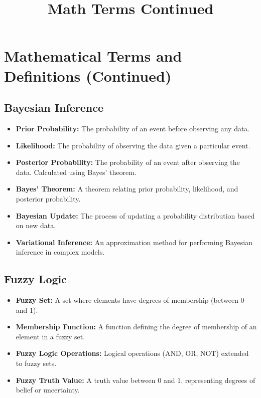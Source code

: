 \documentclass{article}
\title{Math Terms Continued}
\date{}
\begin{document}
\maketitle

\section{Mathematical Terms and Definitions (Continued)}

\subsection{Bayesian Inference}

\begin{itemize}
    \item \textbf{Prior Probability:} The probability of an event before observing any data.
    \item \textbf{Likelihood:} The probability of observing the data given a particular event.
    \item \textbf{Posterior Probability:} The probability of an event after observing the data.  Calculated using Bayes' theorem.
    \item \textbf{Bayes' Theorem:} A theorem relating prior probability, likelihood, and posterior probability.
    \item \textbf{Bayesian Update:} The process of updating a probability distribution based on new data.
    \item \textbf{Variational Inference:} An approximation method for performing Bayesian inference in complex models.
\end{itemize}

\subsection{Fuzzy Logic}

\begin{itemize}
    \item \textbf{Fuzzy Set:} A set where elements have degrees of membership (between 0 and 1).
    \item \textbf{Membership Function:} A function defining the degree of membership of an element in a fuzzy set.
    \item \textbf{Fuzzy Logic Operations:}  Logical operations (AND, OR, NOT) extended to fuzzy sets.
    \item \textbf{Fuzzy Truth Value:} A truth value between 0 and 1, representing degrees of belief or uncertainty.
\end{itemize}
\end{document}
